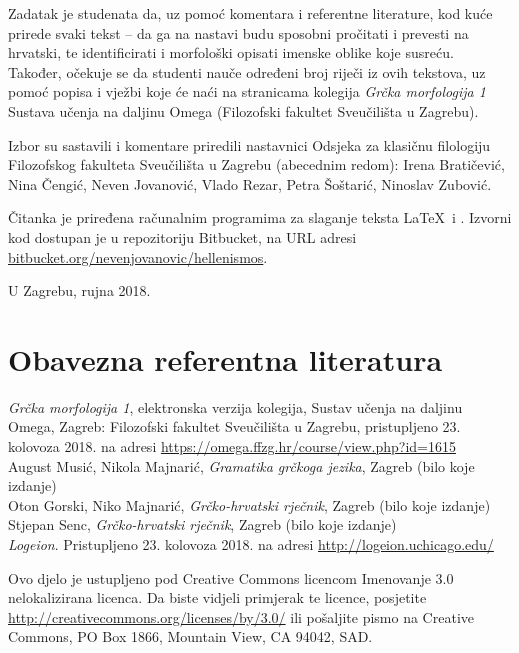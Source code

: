 \documentclass[a4paper,12pt,twoside]{report}
\begin{document}
Zadatak je studenata da, uz pomoć komentara i referentne literature, kod kuće prirede svaki tekst – da ga na nastavi budu sposobni pročitati i prevesti na hrvatski, te identificirati i morfološki opisati imenske oblike koje susreću. Također, očekuje se da studenti nauče određeni broj riječi iz ovih tekstova, uz pomoć popisa i vježbi koje će naći na stranicama kolegija \textit{Grčka morfologija 1} Sustava učenja na daljinu Omega (Filozofski fakultet Sveučilišta u Zagrebu).

\newpage

Izbor su sastavili i komentare priredili nastavnici Odsjeka za klasičnu filologiju Filozofskog fakulteta Sveučilišta u Zagrebu (abecednim redom): Irena Bratičević, Nina Čengić, Neven Jovanović, Vlado Rezar, Petra Šoštarić, Ninoslav Zubović.

Čitanka je priređena računalnim programima za slaganje teksta \LaTeX\ i \XeLaTeX. Izvorni kod dostupan je u repozitoriju Bitbucket, na URL adresi \href{https://bitbucket.org/nevenjovanovic/hellenismos}{bitbucket.org/nevenjovanovic/hellenismos}.

\medskip

U Zagrebu, rujna 2018.

\section*{Obavezna referentna literatura}

\textit{Grčka morfologija 1}, elektronska verzija kolegija, Sustav učenja na daljinu Omega, Zagreb: Filozofski fakultet Sveučilišta u Zagrebu, pristupljeno 23. kolovoza 2018. na adresi \url{https://omega.ffzg.hr/course/view.php?id=1615}\\
August Musić, Nikola Majnarić, \textit{Gramatika grčkoga jezika}, Zagreb (bilo koje izdanje)\\
Oton Gorski, Niko Majnarić, \textit{Grčko-hrvatski rječnik}, Zagreb (bilo koje izdanje)\\
Stjepan Senc, \textit{Grčko-hrvatski rječnik}, Zagreb (bilo koje izdanje)\\
\textit{Logeion}. Pristupljeno 23. kolovoza 2018. na adresi \url{http://logeion.uchicago.edu/}\\

\vspace*{\fill}

\noindent Ovo djelo je ustupljeno pod Creative Commons licencom Imenovanje 3.0 nelokalizirana licenca. Da biste vidjeli primjerak te licence, posjetite \url{http://creativecommons.org/licenses/by/3.0/} ili pošaljite pismo na Creative Commons, PO Box 1866, Mountain View, CA 94042, SAD.
\end{document}
